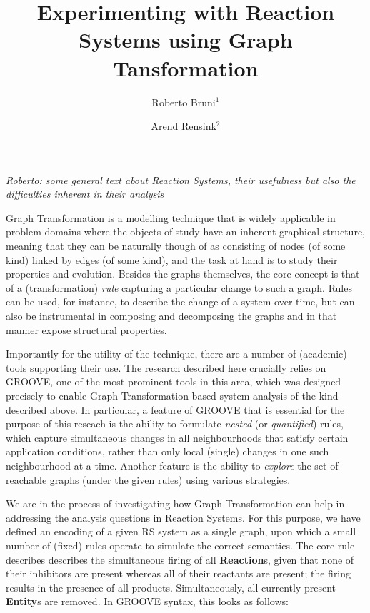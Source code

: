 \documentclass{llncs}
\newcommand{\lab}[1]{\textsf{#1}}
\newcommand{\blab}[1]{\lab{\bfseries #1}}
\begin{document}
\title{Experimenting with Reaction Systems using Graph Tansformation}
\author{Roberto Bruni$^1$ \and Arend Rensink$^2$}

\maketitle

\emph{Roberto: some general text about Reaction Systems, their usefulness but also the difficulties inherent in their analysis}

Graph Transformation is a modelling technique that is widely applicable in problem domains where the objects of study have an inherent graphical structure, meaning that they can be naturally though of as consisting of nodes (of some kind) linked by edges (of some kind), and the task at hand is to study their properties and evolution. Besides the graphs themselves, the core concept is that of a (transformation) \emph{rule} capturing a particular change to such a graph. Rules can be used, for instance, to describe the change of a system over time, but can also be instrumental in composing and decomposing the graphs and in that manner expose structural properties.

Importantly for the utility of the technique, there are a number of (academic) tools supporting their use. The research described here crucially relies on GROOVE, one of the most prominent tools in this area, which was designed precisely to enable Graph Transformation-based system analysis of the kind described above. In particular, a feature of GROOVE that is essential for the purpose of this reseach is the ability to formulate \emph{nested} (or \emph{quantified}) rules, which capture simultaneous changes in all neighbourhoods that satisfy certain application conditions, rather than only local (single) changes in one such neighbourhood at a time. Another feature is the ability to \emph{explore} the set of reachable graphs (under the given rules) using various strategies.

We are in the process of investigating how Graph Transformation can help in addressing the analysis questions in Reaction Systems. For this purpose, we have defined an encoding of a given RS system as a single graph, upon which a small number of (fixed) rules operate to simulate the correct semantics. The core rule describes describes the simultaneous firing of all \blab{Reaction}s, given that none of their \lab{inhibitor}s are present whereas all of their \lab{reactant}s are present; the firing results in the presence of all \lab{product}s. Simultaneously, all currently present \blab{Entity}s are removed. In GROOVE syntax, this looks as follows:
\end{document}
